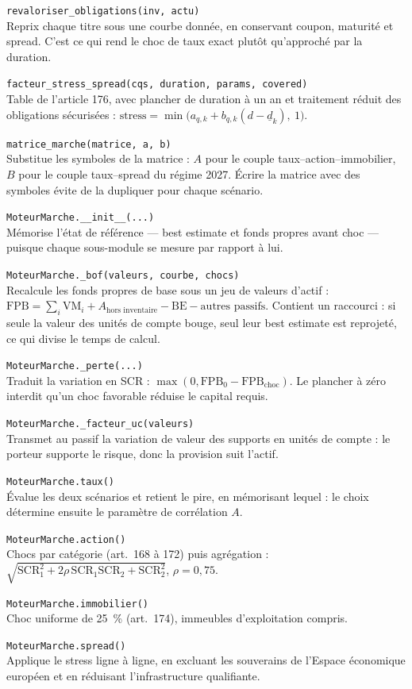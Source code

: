 \documentclass[10pt,a4paper]{article}
\newcommand{\fn}[2]{\par\smallskip\textcolor{bleufonce}{\texttt{#1}}\\ #2\par}
\newcommand{\art}[1]{\textcolor{gris}{\small (art.~#1)}}
\begin{document}
\fn{revaloriser\_obligations(inv, actu)}{Reprix chaque titre sous une courbe donnée, en
conservant coupon, maturité et spread. C'est ce qui rend le choc de taux exact plutôt
qu'approché par la duration.}

\fn{facteur\_stress\_spread(cqs, duration, params, covered)}{Table de l'article 176, avec
plancher de duration à un an et traitement réduit des obligations sécurisées :
$\mathrm{stress} = \min\bigl(a_{q,k} + b_{q,k}(d - \underline d_k),\ 1\bigr)$.}

\fn{matrice\_marche(matrice, a, b)}{Substitue les symboles de la matrice : $A$ pour le couple
taux–action–immobilier, $B$ pour le couple taux–spread du régime 2027. Écrire la matrice avec
des symboles évite de la dupliquer pour chaque scénario.}

\fn{MoteurMarche.\_\_init\_\_(...)}{Mémorise l'état de référence — best estimate et fonds propres
avant choc — puisque chaque sous-module se mesure par rapport à lui.}

\fn{MoteurMarche.\_bof(valeurs, courbe, chocs)}{Recalcule les fonds propres de base sous un jeu
de valeurs d'actif : $\mathrm{FPB} = \sum_i \mathrm{VM}_i + A_{\text{hors inventaire}}
- \mathrm{BE} - \text{autres passifs}$. Contient un raccourci : si seule la valeur des unités de
compte bouge, seul leur best estimate est reprojeté, ce qui divise le temps de calcul.}

\fn{MoteurMarche.\_perte(...)}{Traduit la variation en SCR : $\max(0, \mathrm{FPB}_0 -
\mathrm{FPB}_{\text{choc}})$. Le plancher à zéro interdit qu'un choc favorable réduise le
capital requis.}

\fn{MoteurMarche.\_facteur\_uc(valeurs)}{Transmet au passif la variation de valeur des supports
en unités de compte : le porteur supporte le risque, donc la provision suit l'actif.}

\fn{MoteurMarche.taux()}{Évalue les deux scénarios et retient le pire, en mémorisant lequel :
le choix détermine ensuite le paramètre de corrélation $A$.}

\fn{MoteurMarche.action()}{Chocs par catégorie \art{168 à 172} puis agrégation :
$\sqrt{\mathrm{SCR}_1^2 + 2\rho\,\mathrm{SCR}_1\mathrm{SCR}_2 + \mathrm{SCR}_2^2}$,
$\rho = 0{,}75$.}

\fn{MoteurMarche.immobilier()}{Choc uniforme de \qty{25}{\percent} \art{174}, immeubles
d'exploitation compris.}

\fn{MoteurMarche.spread()}{Applique le stress ligne à ligne, en excluant les souverains de
l'Espace économique européen et en réduisant l'infrastructure qualifiante.}
\end{document}
